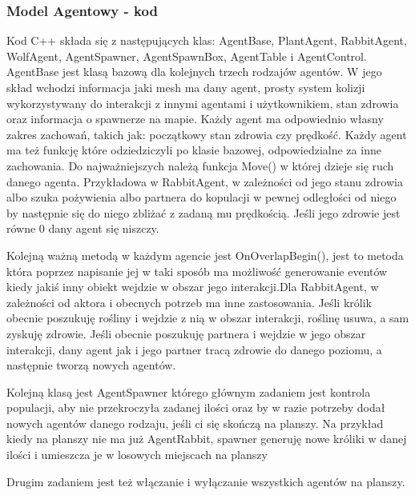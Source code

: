 \documentclass[a4paper,12pt,reqno]{article}
\begin{document}
\subsubsection{Model Agentowy - kod}

Kod C++ składa się z następujących klas: AgentBase, PlantAgent, RabbitAgent, WolfAgent, AgentSpawner, AgentSpawnBox, AgentTable i AgentControl. AgentBase jest klasą bazową dla kolejnych trzech rodzajów agentów. W jego skład wchodzi informacja jaki mesh ma dany agent, prosty system kolizji wykorzystywany do interakcji z innymi agentami i użytkownikiem, stan zdrowia oraz informacja o spawnerze na mapie. Każdy agent ma odpowiednio własny zakres zachowań, takich jak: początkowy stan zdrowia czy prędkość. Każdy agent ma też funkcję które odziedziczyli po klasie bazowej, odpowiedzialne za inne zachowania. Do najważniejszych należą funkcja Move() w której dzieje się ruch danego agenta. Przykładowa w RabbitAgent, w zależności od jego stanu zdrowia albo szuka pożywienia albo partnera do kopulacji w pewnej odległości od niego by następnie się do niego zbliżać z zadaną mu prędkością. Jeśli jego zdrowie jest równe 0 dany agent się niszczy.



Kolejną ważną metodą w każdym agencie jest OnOverlapBegin(), jest to metoda która poprzez napisanie jej w taki sposób ma możliwość generowanie eventów kiedy jakiś inny obiekt wejdzie w obszar jego interakcji.Dla RabbitAgent, w zależności od aktora i obecnych potrzeb ma inne zastosowania. Jeśli królik obecnie poszukuję rośliny i wejdzie z nią w obszar interakcji, roślinę usuwa, a sam zyskuję zdrowie. Jeśli obecnie poszukuję partnera i wejdzie w jego obszar interakcji, dany agent jak i jego partner tracą zdrowie do danego poziomu, a następnie tworzą nowych agentów.
	


Kolejną klasą jest AgentSpawner którego głównym zadaniem jest kontrola populacji, aby nie przekroczyła zadanej ilości oraz by w razie potrzeby dodał nowych agentów danego rodzaju, jeśli ci się skończą na planszy. Na przykład kiedy na planszy nie ma już AgentRabbit, spawner generuję nowe króliki w danej ilości i umieszcza je w losowych miejscach na planszy


Drugim zadaniem jest też włączanie i wyłączanie wszystkich agentów na planszy.
\end{document}
